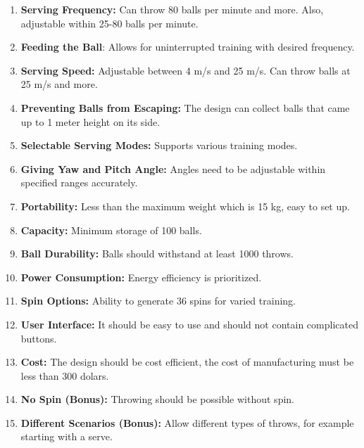 \documentclass[12pt]{report}
\begin{document}
\begin{enumerate}
    \item \textbf{Serving Frequency:} Can throw 80 balls per minute and more. Also, adjustable within 25-80 balls per minute.
    \item \textbf{Feeding the Ball}: Allows for uninterrupted training with desired frequency.
    \item \textbf{Serving Speed:} Adjustable between 4 m/s and 25 m/s. Can throw balls at 25 m/s and more.
    \item \textbf{Preventing Balls from Escaping:} The design can collect balls that came up to 1 meter height on its side.
    \item \textbf{Selectable Serving Modes:} Supports various training modes.
    \item \textbf{Giving Yaw and Pitch Angle:} Angles need to be adjustable within specified ranges accurately.
    \item \textbf{Portability:} Less than the maximum weight which is 15 kg, easy to set up.
    \item \textbf{Capacity:} Minimum storage of 100 balls.
    \item \textbf{Ball Durability:} Balls should withstand at least 1000 throws.
    \item \textbf{Power Consumption:} Energy efficiency is prioritized.
    \item \textbf{Spin Options:} Ability to generate 36 spins for varied training.
    \item \textbf{User Interface:} It should be easy to use and should not contain complicated buttons.
    \item \textbf{Cost:} The design should be cost efficient, the cost of manufacturing must be less than 300 dolars.
    \item \textbf{No Spin (Bonus):} Throwing should be possible without spin.
    \item \textbf{Different Scenarios (Bonus):} Allow different types of throws, for example starting with a serve.
\end{enumerate}
\end{document}

